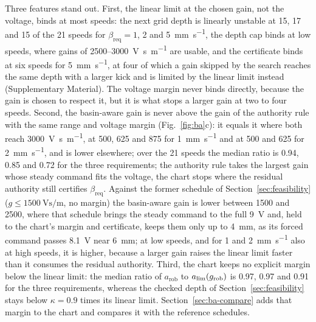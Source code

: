 Three features stand out. First, the linear limit at the chosen gain, not the voltage, binds at most speeds: the next grid depth is linearly unstable at 15, 17 and 15 of the 21 speeds for $\beta_{\mathrm{req}}=1$, 2 and \SI{5}{\milli\metre\per\second}, the depth cap binds at low speeds, where gains of 2500--\SI{3000}{\volt\second\per\metre} are usable, and the certificate binds at six speeds for \SI{5}{\milli\metre\per\second}, at four of which a gain skipped by the search reaches the same depth with a larger kick and is limited by the linear limit instead (Supplementary Material). The voltage margin never binds directly, because the gain is chosen to respect it, but it is what stops a larger gain at two to four speeds. Second, the basin-aware gain is never above the gain of the authority rule with the same range and voltage margin (Fig.~\ref{fig:ba}c): it equals it where both reach \SI{3000}{\volt\second\per\metre}, at 500, 625 and \SI{875}{\rpm} for \SI{1}{\milli\metre\per\second} and at 500 and \SI{625}{\rpm} for \SI{2}{\milli\metre\per\second}, and is lower elsewhere; over the 21 speeds the median ratio is 0.94, 0.85 and 0.72 for the three requirements; the authority rule takes the largest gain whose steady command fits the voltage, the chart stops where the residual authority still certifies $\beta_{\mathrm{req}}$. Against the former schedule of Section~\ref{sec:feasibility} ($g\le\SI{1500}{\volt\second\per\metre}$, no margin) the basin-aware gain is lower between 1500 and \SI{2500}{\rpm}, where that schedule brings the steady command to the full \SI{9}{\volt} and, held to the chart's margin and certificate, keeps them only up to \SI{4}{\milli\metre}, as its forced command passes \SI{8.1}{\volt} near \SI{6}{\milli\metre}; at low speeds, and for 1 and \SI{2}{\milli\metre\per\second} also at high speeds, it is higher, because a larger gain raises the linear limit faster than it consumes the residual authority. Third, the chart keeps no explicit margin below the linear limit: the median ratio of $a_{\mathrm{rob}}$ to $a_{\lim}(g_{\mathrm{rob}})$ is 0.97, 0.97 and 0.91 for the three requirements, whereas the checked depth of Section~\ref{sec:feasibility} stays below $\kappa=0.9$ times its linear limit. Section~\ref{sec:ba-compare} adds that margin to the chart and compares it with the reference schedules.
